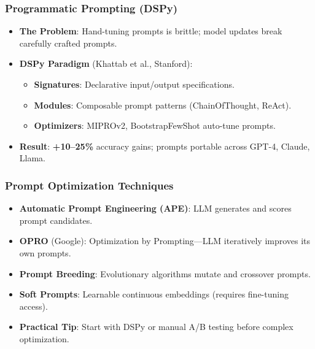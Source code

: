 \documentclass{beamer}
\begin{document}
\begin{frame}
    \frametitle{Programmatic Prompting (DSPy)}
    \begin{itemize}
        \item \textbf{The Problem}: Hand-tuning prompts is brittle; model updates break carefully crafted prompts.
        \item \textbf{DSPy Paradigm} (Khattab et al., Stanford):
        \begin{itemize}
            \item \textbf{Signatures}: Declarative input/output specifications.
            \item \textbf{Modules}: Composable prompt patterns (ChainOfThought, ReAct).
            \item \textbf{Optimizers}: MIPROv2, BootstrapFewShot auto-tune prompts.
        \end{itemize}
        \item \textbf{Result}: \textbf{+10--25\%} accuracy gains; prompts portable across GPT-4, Claude, Llama.
    \end{itemize}
\end{frame}

\begin{frame}
    \frametitle{Prompt Optimization Techniques}
    \begin{itemize}
        \item \textbf{Automatic Prompt Engineering (APE)}: LLM generates and scores prompt candidates.
        \item \textbf{OPRO} (Google): Optimization by Prompting---LLM iteratively improves its own prompts.
        \item \textbf{Prompt Breeding}: Evolutionary algorithms mutate and crossover prompts.
        \item \textbf{Soft Prompts}: Learnable continuous embeddings (requires fine-tuning access).
        \item \textbf{Practical Tip}: Start with DSPy or manual A/B testing before complex optimization.
    \end{itemize}
\end{frame}
\end{document}
